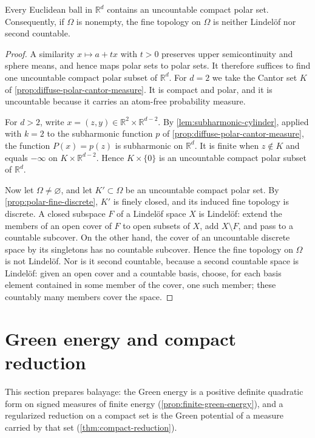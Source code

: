 \begin{example}\label{ex:uncountable-polar-cantor}
Every Euclidean ball in $\mathbb R^d$ contains an uncountable compact polar set. Consequently, if $\Omega$ is nonempty, the fine topology on $\Omega$ is neither Lindel\"of nor second countable.
\end{example}
\begin{proof}
A similarity $x\mapsto a+tx$ with $t>0$ preserves upper semicontinuity and sphere means, and hence maps polar sets to polar sets. It therefore suffices to find one uncountable compact polar subset of $\mathbb R^d$. For $d=2$ we take the Cantor set $K$ of \cref{prop:diffuse-polar-cantor-measure}. It is compact and polar, and it is uncountable because it carries an atom-free probability measure.

For $d>2$, write $x=(z,y)\in\mathbb R^2\times\mathbb R^{d-2}$. By \cref{lem:subharmonic-cylinder}, applied with $k=2$ to the subharmonic function $p$ of \cref{prop:diffuse-polar-cantor-measure}, the function $P(x)=p(z)$ is subharmonic on $\mathbb R^d$. It is finite when $z\notin K$ and equals $-\infty$ on $K\times\mathbb R^{d-2}$. Hence $K\times\{0\}$ is an uncountable compact polar subset of $\mathbb R^d$.

Now let $\Omega\neq\varnothing$, and let $K'\subset\Omega$ be an uncountable compact polar set. By \cref{prop:polar-fine-discrete}, $K'$ is finely closed, and its induced fine topology is discrete. A closed subspace $F$ of a Lindel\"of space $X$ is Lindel\"of: extend the members of an open cover of $F$ to open subsets of $X$, add $X\setminus F$, and pass to a countable subcover. On the other hand, the cover of an uncountable discrete space by its singletons has no countable subcover. Hence the fine topology on $\Omega$ is not Lindel\"of. Nor is it second countable, because a second countable space is Lindel\"of: given an open cover and a countable basis, choose, for each basis element contained in some member of the cover, one such member; these countably many members cover the space.
\end{proof}

\section{Green energy and compact reduction}
\label{sec:green-reduction}
This section prepares balayage: the Green energy is a positive definite quadratic form on signed measures of finite energy (\cref{prop:finite-green-energy}), and a regularized reduction on a compact set is the Green potential of a measure carried by that set (\cref{thm:compact-reduction}).


